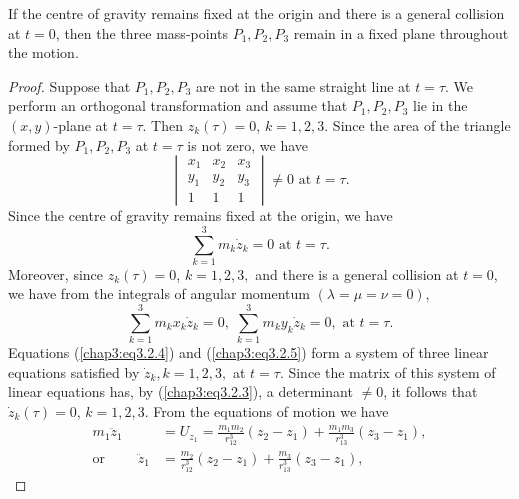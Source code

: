 \setcounter{subtheorem}{0}
\begin{subtheorem}[Sundman]\label{chap3:thm3.2.1}
If the centre of gravity remains fixed at the origin and there is a
general collision at $t = 0$, then the three mass-points $P_1, P_2,
P_3$ remain in a fixed plane throughout the  motion. 
\end{subtheorem}

\begin{proof}
Suppose that $P_1, P_2, P_3$ are not in the same straight line at $t =
\tau$. We perform an orthogonal transformation and assume that $P_1,
P_2, P_3$ lie in the $(x,y)$-plane at $t = \tau$. Then $z_k(\tau) =
0$, $k = 1,2,3$. Since the area of the triangle formed by $P_1, P_2,
P_3$ at $t = \tau$ is not zero, we have 
\begin{equation*}
\begin{vmatrix}
x_1 & x_2 & x_3\\
y_1 & y_2 & y_3\\
1 & 1 & 1 
\end{vmatrix} \neq 0 \text{ at } t =
\tau. \tag{3.2.3}\label{chap3:eq3.2.3} 
\end{equation*}\pageoriginale
Since the centre of gravity remains fixed at the origin, we have 
\begin{equation*}
\sum\limits^3_{k=1} m_k \dot{z}_k = 0 \text{ at } t =
\tau. \tag{3.2.4}\label{chap3:eq3.2.4} 
\end{equation*}
Moreover, since $z_k (\tau) = 0$, $k = 1,2,3,$ and there is a general
collision at $t = 0$, we have from the integrals of angular momentum
$(\lambda = \mu = \nu = 0)$, 
\begin{equation*}
\sum\limits^3_{k=1} m_k x_k \dot{z}_k = 0, \; \sum\limits^3_{k=1} m_k
y_k \dot{z}_k = 0, \text{ at } t =
\tau. \tag{3.2.5}\label{chap3:eq3.2.5} 
\end{equation*}
Equations (\ref{chap3:eq3.2.4}) and (\ref{chap3:eq3.2.5}) form a
system of three linear equations satisfied by $\dot{z}_k, k = 1,2,3,$
at $t = \tau$. Since the matrix of this system of linear equations
has, by (\ref{chap3:eq3.2.3}), a determinant $\neq 0$, it follows that
$\dot{z}_k (\tau) = 0$, $k = 1,2,3$. From the equations of  motion we
have  
\begin{align*}
m_1 \ddot{z}_1 & = U_{z_1} = \frac{m_1 m_2}{r^3_{12}} (z_2 - z_1) +
\frac{m_1 m_3}{r^3_{13}}  (z_3 - z_1), \\ 
\text{or } \qquad \ddot{z}_1 & = \frac{m_2}{r^3_{12}} (z_2 - z_1) +
\frac{m_3}{r^3_{13}} (z_3 - z_1), 
\end{align*}

\end{proof}
